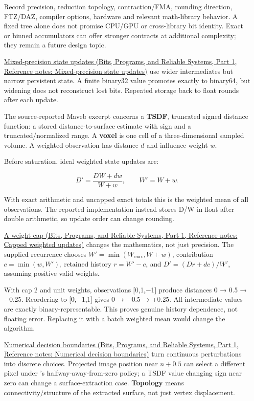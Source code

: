 Record precision, reduction topology, contraction/FMA, rounding direction, FTZ/DAZ, compiler options, hardware and relevant math-library behavior. A fixed tree alone does not promise CPU/GPU or cross-library bit identity. Exact or binned accumulators can offer stronger contracts at additional complexity; they remain a future design topic.

\href{../01-Bits-Programs-and-Reliable-Systems-P01/main.pdf\#nameddest=appendix-260182e617b7}{Mixed-precision state updates (Bits, Programs, and Reliable Systems, Part 1, Reference notes: Mixed-precision state updates)} use wider intermediates but narrow persistent state. A finite binary32 value promotes exactly to binary64, but widening does not reconstruct lost bits. Repeated storage back to float rounds after each update.

The source-reported Maveb excerpt concerns a \textbf{TSDF}, truncated signed distance function: a stored distance-to-surface estimate with sign and a truncated/normalized range. A \textbf{voxel} is one cell of a three-dimensional sampled volume. A weighted observation has distance \(d\) and influence weight \(w\).

Before saturation, ideal weighted state updates are:

\[
D'=\frac{DW+dw}{W+w},\qquad W'=W+w.
\]

With exact arithmetic and uncapped exact totals this is the weighted mean of all observations. The reported implementation instead stores D/W in float after double arithmetic, so update order can change rounding.

\href{../01-Bits-Programs-and-Reliable-Systems-P01/main.pdf\#nameddest=appendix-1e45d0613db3}{A weight cap (Bits, Programs, and Reliable Systems, Part 1, Reference notes: Capped weighted updates)} changes the mathematics, not just precision. The supplied recurrence chooses \(W'=\min(W_{\max},W+w)\), contribution \(c=\min(w,W')\), retained history \(r=W'-c\), and \(D'=(Dr+dc)/W'\), assuming positive valid weights.

With cap 2 and unit weights, observations {[}0,1,−1{]} produce distances 0 → 0.5 → −0.25. Reordering to {[}0,−1,1{]} gives 0 → −0.5 → +0.25. All intermediate values are exactly binary-representable. This proves genuine history dependence, not floating error. Replacing it with a batch weighted mean would change the algorithm.

\href{../01-Bits-Programs-and-Reliable-Systems-P01/main.pdf\#nameddest=appendix-c80db39080be}{Numerical decision boundaries (Bits, Programs, and Reliable Systems, Part 1, Reference notes: Numerical decision boundaries)} turn continuous perturbations into discrete choices. Projected image position near \(n+0.5\) can select a different pixel under 's halfway-away-from-zero policy; a TSDF value changing sign near zero can change a surface-extraction case. \textbf{Topology} means connectivity/structure of the extracted surface, not just vertex displacement.

